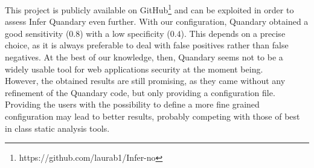 \documentclass[../Report.tex]{subfiles}
\begin{document}
This project is publicly available on GitHub\footnote{https://github.com/laurab1/Infer-no} and can be exploited in order to assess Infer Quandary even further.
With our configuration, Quandary obtained a good sensitivity ($0.8$) with a low specificity ($0.4$). This depends on a precise choice, as it is always preferable to deal with false positives rather than false negatives. At the best of our knowledge, then, Quandary seems not to be a widely usable tool for web applications security at the moment being. \\
However, the obtained results are still promising, as they came without any refinement of the Quandary code, but only providing a configuration file. Providing the users with the possibility to define a more fine grained configuration may lead to better results, probably competing with those of best in class static analysis tools.
\end{document}
